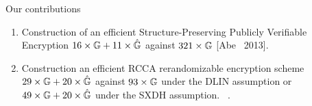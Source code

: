 \begin{frame}{Our contributions}

  \begin{enumerate}
  \item\alert<+>{ Construction of an efficient Structure-Preserving Publicly Verifiable Encryption $16\times\mathbb{G} + 11\times\hat{\mathbb{G}}$ against $321\times\mathbb{G}$ [Abe \etal~2013].}
  \item\alert<+>{ Construction an efficient RCCA rerandomizable encryption scheme $29 \times\mathbb{G} + 20 \times\hat{\mathbb{G}}$ against $93\times\mathbb{G}$ under the DLIN assumption or $49\times\mathbb{G} +20 \times\hat{\mathbb{G}}$ under the SXDH assumption.~\cite{DBLP:conf/eurocrypt/ChaseKLM12} }.
  \end{enumerate}
\end{frame}
